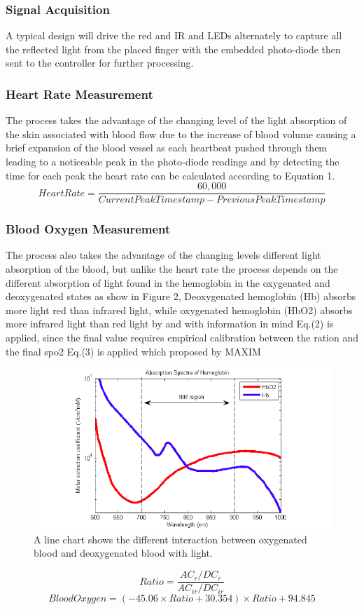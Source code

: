 \documentclass{bmcart}
\begin{document}
\subsubsection*{Signal Acquisition}
A typical design will drive the red and IR and LEDs alternately to capture all
the reflected light from the placed finger with the embedded photo-diode then
sent to the controller for further processing.\\

\subsubsection*{Heart Rate Measurement}
The process takes the advantage of the changing level of the light absorption of
the skin associated with blood flow due to the increase of blood volume causing
a brief expansion of the blood vessel as each heartbeat pushed through them
leading to a noticeable peak in the photo-diode readings and by detecting the
time for each peak the heart rate can be calculated according to Equation 1.\\
%
\[
 Heart Rate = \frac{60,000}{Current Peak Timestamp - Previous Peak Timestamp}
 \tag{1}
\]
%

\subsubsection*{Blood Oxygen Measurement}
The process also takes the advantage of  the changing levels different light
absorption of the blood, but unlike the heart rate the process depends on the
different absorption of light found in the hemoglobin in the oxygenated and
deoxygenated states as show in Figure 2, Deoxygenated hemoglobin (Hb) absorbs
more light red than infrared light, while oxygenated hemoglobin (HbO2) absorbs
more infrared light than red light by and with information in mind Eq.(2) is
applied, since the final value requires empirical calibration between the ration
and the final spo2 Eq.(3) is applied which proposed by MAXIM%
\begin{figure}[h!]
  \includegraphics[width=.5\linewidth]{png_images/hbvshbo2.png}
  \caption{
      A line chart shows the different interaction between oxygenated blood and
      deoxygenated blood with light.}
\end{figure}
\FloatBarrier
\[
 Ratio = \frac{AC_r/DC_r}{AC_{ir}/DC_{ir}}
 \tag{2}
\]
\[
 Blood Oxygen = (-45.06 \times Ratio + 30.354) \times Ratio + 94.845
 \tag{3}
\]
%
\end{document}
